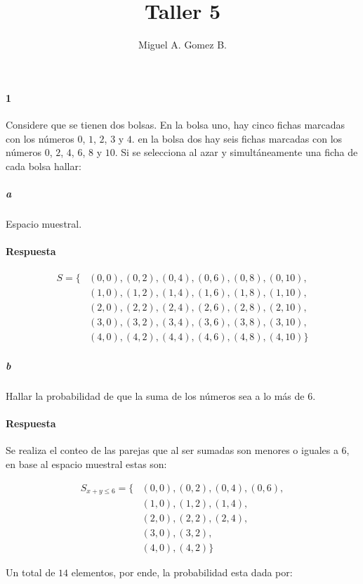 \documentclass{article}
\begin{document}
	\title{Taller 5}
	\author{Miguel A. Gomez B.}
	\maketitle
\paragraph{1} Considere que se tienen dos bolsas. En la bolsa uno, hay cinco fichas marcadas con los números $0$, $1$, $2$, $3$ y $4$. en la bolsa dos hay seis fichas marcadas con los números  $0$, $2$, $4$, $6$, $8$ y $10$. Si se selecciona al azar y simultáneamente una ficha de cada bolsa hallar:

\subparagraph{a} Espacio muestral.

\paragraph{Respuesta}

\begin{align*}
	S = \{ &(0,0), (0,2), (0,4), (0,6), (0,8), (0,10), \\
	       &(1,0), (1,2), (1,4), (1,6), (1,8), (1,10), \\
   	       &(2,0), (2,2), (2,4), (2,6), (2,8), (2,10), \\
   	       &(3,0), (3,2), (3,4), (3,6), (3,8), (3,10), \\
   	       &(4,0), (4,2), (4,4), (4,6), (4,8), (4,10)
	    \}
\end{align*}

\subparagraph{b} Hallar la probabilidad de que la suma de los números sea a lo más de $6$.
\paragraph{Respuesta} Se realiza el conteo de las parejas que al ser sumadas son menores o iguales a 6, en base al espacio muestral estas son:

\begin{align*}
S_{x+y \leq 6} = \{ 
		&(0,0), (0,2), (0,4), (0,6),\\
		&(1,0), (1,2), (1,4),\\
		&(2,0), (2,2), (2,4),\\
		&(3,0), (3,2),\\
		&(4,0), (4,2)
\}
\end{align*}

Un total de $14$ elementos, por ende, la probabilidad esta dada por:
\end{document}
